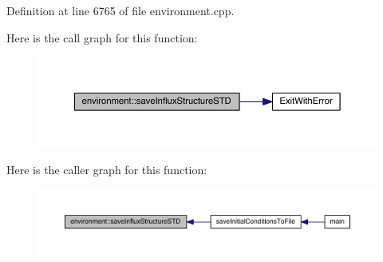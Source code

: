 Definition at line 6765 of file environment.\+cpp.



Here is the call graph for this function\+:\nopagebreak
\begin{figure}[H]
\begin{center}
\leavevmode
\includegraphics[width=350pt]{a00013_a8f831e2db11fa5d840484345dac64fc7_cgraph}
\end{center}
\end{figure}




Here is the caller graph for this function\+:\nopagebreak
\begin{figure}[H]
\begin{center}
\leavevmode
\includegraphics[width=350pt]{a00013_a8f831e2db11fa5d840484345dac64fc7_icgraph}
\end{center}
\end{figure}


